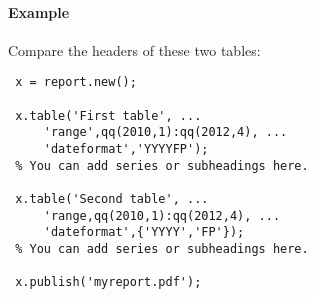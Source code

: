  \paragraph{Example}
 
 Compare the headers of these two tables:
 
 \begin{verbatim}
 x = report.new();
 
 x.table('First table', ...
     'range',qq(2010,1):qq(2012,4), ...
     'dateformat','YYYYFP');
 % You can add series or subheadings here.
 
 x.table('Second table', ...
     'range,qq(2010,1):qq(2012,4), ...
     'dateformat',{'YYYY','FP'});
 % You can add series or subheadings here.
 
 x.publish('myreport.pdf');
 \end{verbatim}


